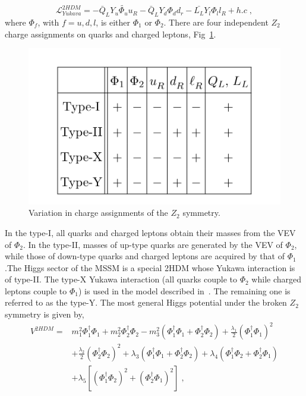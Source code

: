 \newline
\begin{equation}
\mathcal{L}_{Yukava}^{2HDM} = - \bar{Q}_L Y_u \tilde{\Phi_u}u_R  - \bar{Q}_L Y_d \Phi_d d_r  -\bar{L_L} Y_l \Phi_l l_R +h.c  \; , \end{equation}
\newline
where $\Phi_f$, with $f=u,d,l$,  is either   $\Phi_1$ or $\Phi_2$. There are four independent $Z_2$ charge assignments on quarks and charged leptons, Fig~\ref{2hdm}.
\begin{figure}
\centering
\includegraphics[scale= 0.8]{../Cap1/2hdm}
\caption{Variation in charge assignments of the $Z_2$ symmetry.}
\label{2hdm}
\end{figure}
 In the type-I, all quarks and charged leptons obtain their masses from the VEV of $\Phi_2$.  
In the type-II, masses of up-type quarks are generated by the VEV of  $\Phi_2$, while those of down-type quarks and charged leptons are acquired by that of  $\Phi_1$.The Higgs sector of the MSSM is a special 2HDM whose Yukawa interaction is of type-II. The type-X Yukawa interaction (all quarks couple to  $\Phi_2$ while charged leptons couple to  $\Phi_1$) is used in the model described in~\cite{PhysRevD.80.015017}. The remaining one is referred to as the type-Y.
The most general Higgs potential under the  broken $Z_2$ symmetry is given by,
\newline
\begin{equation}
\begin{split}
V^{2HDM}=& m_1^2 \Phi_1^{\dag}\Phi_1 +m_2^2 \Phi_2^{\dag}\Phi_2 -m_3^2(\Phi_1^{\dag}\Phi_1 +  \Phi_2^{\dag}\Phi_2) +\frac{\lambda_1}{2}(\Phi_1^{\dag}\Phi_1)^2  \\
&+\frac{\lambda_2}{2}(\Phi_2^{\dag}\Phi_2)^2  +\lambda_3 (\Phi_1^{\dag}\Phi_1 +  \Phi_2^{\dag}\Phi_2) +\lambda_4 (\Phi_1^{\dag}\Phi_2 +  \Phi_2^{\dag}\Phi_1)  \\
&+\lambda_5 [(\Phi_1^{\dag}\Phi_2)^2 + (\Phi_2^{\dag}\Phi_1)^2] \; , \end{split} \end{equation}
